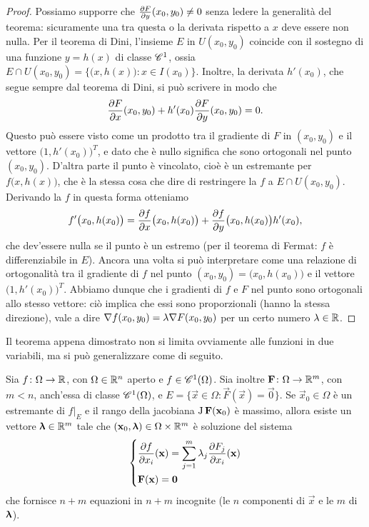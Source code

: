 \begin{proof}
	Possiamo supporre che $\drp{F}{y}(x_0,y_0)\neq 0$ senza ledere la generalità del teorema: sicuramente una tra questa o la derivata rispetto a $x$ deve essere non nulla.
	Per il teorema di Dini, l'insieme $E$ in $U(x_0,y_0)$ coincide con il sostegno di una funzione $y=h(x)$ di classe $\cclass[1]$, ossia $E\cap U(x_0,y_0)=\{\big(x,h(x)\big)\colon x\in I(x_0)\}$.
	Inoltre, la derivata $h'(x_0)$, che segue sempre dal teorema di Dini, si può scrivere in modo che
	\begin{equation}
		\drp{F}{x}(x_0,y_0)+h'(x_0)\drp{F}{y}(x_0,y_0)=0.
	\end{equation}
	Questo può essere visto come un prodotto tra il gradiente di $F$ in $(x_0,y_0)$ e il vettore $\big(1,h'(x_0)\big)^T$, e dato che è nullo significa che sono ortogonali nel punto $(x_0,y_0)$.
	D'altra parte il punto è vincolato, cioè è un estremante per $f\big(x,h(x)\big)$, che è la stessa cosa che dire di restringere la $f$ a $E\cap U(x_0,y_0)$.
	Derivando la $f$ in questa forma otteniamo
	\begin{equation}
		f'\big(x_0,h(x_0)\big)=\drp{f}{x}\big(x_0,h(x_0)\big)+\drp{f}{y}\big(x_0,h(x_0)\big)h'(x_0),
	\end{equation}
	che dev'essere nulla se il punto è un estremo (per il teorema di Fermat: $f$ è differenziabile in $E$).
	Ancora una volta si può interpretare come una relazione di ortogonalità tra il gradiente di $f$ nel punto $(x_0,y_0)=\big(x_0,h(x_0)\big)$ e il vettore $\big(1,h'(x_0)\big)^T$.
	Abbiamo dunque che i gradienti di $f$ e $F$ nel punto sono ortogonali allo stesso vettore: ciò implica che essi sono proporzionali (hanno la stessa direzione), vale a dire $\grad f(x_0,y_0)=\lambda\grad F(x_0,y_0)$ per un certo numero $\lambda\in\R$.
\end{proof}
Il teorema appena dimostrato non si limita ovviamente alle funzioni in due variabili, ma si può generalizzare come di seguito.
\begin{teorema}[Lagrange] \label{t:moltiplicatori-lagrange}
	Sia $f\colon\Omega\to\R$, con $\Omega\in\R^n$ aperto e $f\in\cont[1]{\Omega}$. Sia inoltre $\vec F\colon\Omega\to\R^m$, con $m<n$, anch'essa di classe $\cont[1]{\Omega}$, e $E=\{\vec x\in\Omega\colon\vec F(\vec x)=\vec 0\}$.
	Se $\vec x_0\in\Omega$ è un estremante di $f|_E$ e il rango della jacobiana $\jac\vec F(\vec x_0)$ è massimo, allora esiste un vettore $\vlambda\in\R^m$ tale che $(\vec x_0,\vlambda)\in\Omega\times\R^m$ è soluzione del sistema
	\begin{equation} 
		\begin{dcases}
			\drp{f}{x_i}(\vec x)=\sum_{j=1}^m\lambda_j\drp{F_j}{x_i}(\vec x)\\
			\vec F(\vec x)=\vec 0
		\end{dcases}
		\label{eq:moltiplicatori-lagrange}
	\end{equation}
	che fornisce $n+m$ equazioni in $n+m$ incognite (le $n$ componenti di $\vec x$ e le $m$ di $\vlambda$).
\end{teorema}
